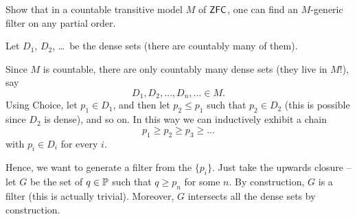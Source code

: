 \begin{problem}
	\label{prob:rslemma}
	Show that in a countable transitive model $M$ of $\mathsf{ZFC}$,
	one can find an $M$-generic filter on any partial order.
	\begin{hint}
		Let $D_1$, $D_2$, \dots\ be the dense sets (there are countably many of them).
	\end{hint}
	\begin{sol}
	Since $M$ is countable, there are only countably many dense sets (they live in $M$!),
	say \[ D_1, D_2, \ldots, D_n, \ldots \in M. \]
	Using Choice,
	let $p_1 \in D_1$, and then let $p_2 \le p_1$ such that $p_2 \in D_2$
	(this is possible since $D_2$ is dense), and so on.
	In this way we can inductively exhibit a chain
	\[ p_1 \ge p_2 \ge p_3 \ge \dots \]
	with $p_i \in D_i$ for every $i$.

	Hence, we want to generate a filter from the $\{p_i\}$.
	Just take the upwards closure -- let $G$ be the set of $q \in \mathbb P$ such that $q \ge p_n$ for some $n$.
	By construction, $G$ is a filter (this is actually trivial).
	Moreover, $G$ intersects all the dense sets by construction.
	\end{sol}
\end{problem}


